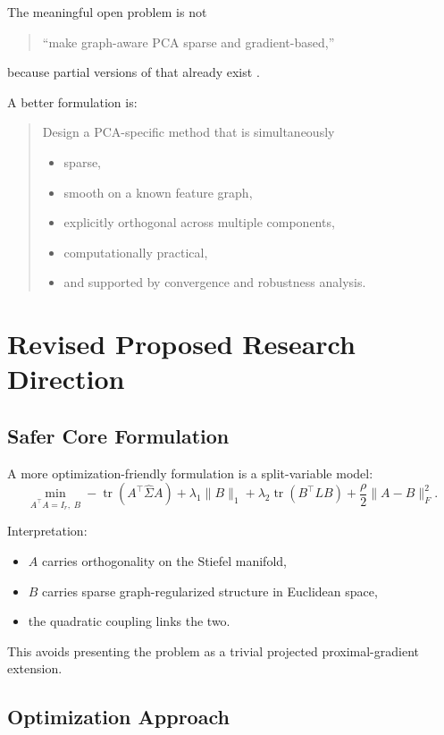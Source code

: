 \documentclass[11pt]{article}
\begin{document}
The meaningful open problem is not
\begin{quote}
``make graph-aware PCA sparse and gradient-based,''
\end{quote}
because partial versions of that already exist \cite{feng2019glspca,wu2019gdspca,wang2025rsspca}.

A better formulation is:

\begin{quote}
Design a PCA-specific method that is simultaneously
\begin{itemize}
    \item sparse,
    \item smooth on a known feature graph,
    \item explicitly orthogonal across multiple components,
    \item computationally practical,
    \item and supported by convergence and robustness analysis.
\end{itemize}
\end{quote}

\section{Revised Proposed Research Direction}

\subsection{Safer Core Formulation}

A more optimization-friendly formulation is a split-variable model:
\[
\min_{A^\top A = I_r,\; B}
-\operatorname{tr}(A^\top \widehat{\Sigma} A)
+ \lambda_1 \|B\|_1
+ \lambda_2 \operatorname{tr}(B^\top L B)
+ \frac{\rho}{2}\|A-B\|_F^2.
\]

Interpretation:
\begin{itemize}
    \item $A$ carries orthogonality on the Stiefel manifold,
    \item $B$ carries sparse graph-regularized structure in Euclidean space,
    \item the quadratic coupling links the two.
\end{itemize}

This avoids presenting the problem as a trivial projected proximal-gradient extension.

\subsection{Optimization Approach}
\end{document}

